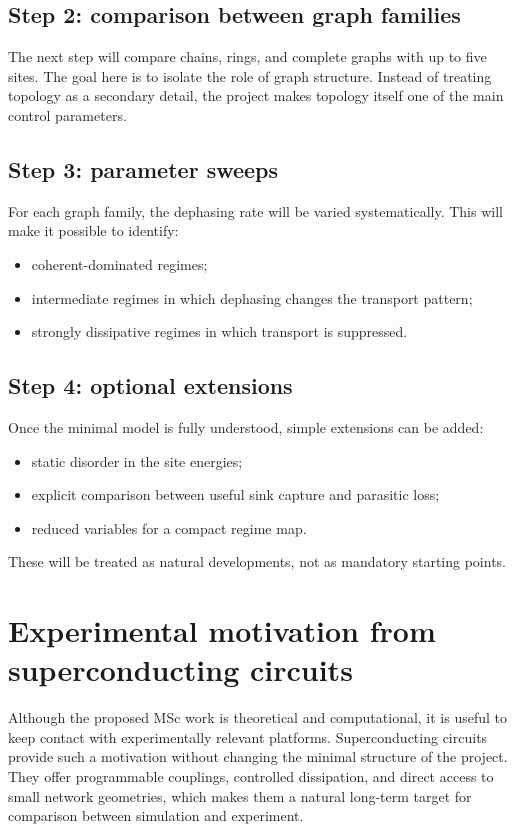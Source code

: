 \documentclass[11pt,a4paper]{article}
\begin{document}
\subsection{Step 2: comparison between graph families}

The next step will compare chains, rings, and complete graphs with up to five
sites. The goal here is to isolate the role of graph structure. Instead of
treating topology as a secondary detail, the project makes topology itself one
of the main control parameters.

\subsection{Step 3: parameter sweeps}

For each graph family, the dephasing rate will be varied systematically. This
will make it possible to identify:
\begin{itemize}
  \item coherent-dominated regimes;
  \item intermediate regimes in which dephasing changes the transport pattern;
  \item strongly dissipative regimes in which transport is suppressed.
\end{itemize}

\subsection{Step 4: optional extensions}

Once the minimal model is fully understood, simple extensions can be added:
\begin{itemize}
  \item static disorder in the site energies;
  \item explicit comparison between useful sink capture and parasitic loss;
  \item reduced variables for a compact regime map.
\end{itemize}

These will be treated as natural developments, not as mandatory starting points.

\section{Experimental motivation from superconducting circuits}

Although the proposed MSc work is theoretical and computational, it is useful
to keep contact with experimentally relevant platforms. Superconducting circuits
provide such a motivation without changing the minimal structure of the
project. They offer programmable couplings, controlled dissipation, and direct
access to small network geometries, which makes them a natural long-term target
for comparison between simulation and experiment.
\end{document}
